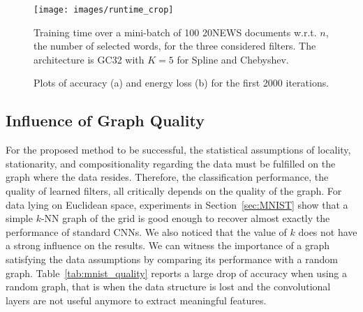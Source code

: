 \documentclass{article}
\newcommand{\tabref}[1]{Table~\ref{tab:#1}}
\newcommand{\secref}[1]{Section~\ref{sec:#1}}
\begin{document}
\begin{figure}[ht]
\centering
\vspace{-20pt}
\texttt{[image: images/runtime\_crop]}
\caption{Training time over a mini-batch of 100 20NEWS documents w.r.t. $n$, the
number of selected words, for the three considered filters. The architecture is
GC32 with $K=5$ for Spline and Chebyshev.}
\label{fig:runtime}
\end{figure}

\begin{figure}[h!]
\centering
{}
\hfill
{}
\caption{Plots of accuracy (a) and energy loss (b) for the first 2000
iterations.}
\label{fig:convergence}
\end{figure}











\subsection{Influence of Graph Quality} \label{sec:graph_quality}

For the proposed method to be successful, the statistical assumptions of  locality, stationarity, and compositionality regarding the data must be fulfilled on the graph where the data resides. Therefore, the classification performance, the quality of learned filters, all critically depends on the quality of the graph. For data lying on Euclidean space, experiments in    
 \secref{MNIST} show that a simple $k$-NN graph of the grid is good enough to recover almost exactly the performance of standard CNNs. We also noticed that the value of $k$ does not have a strong influence on the results. We can witness the importance of a graph satisfying the data assumptions by comparing its performance with a random
graph. \tabref{mnist_quality} reports a large drop of accuracy when using a random graph, that is when the data structure is lost and the convolutional layers are not useful anymore to extract meaningful features.
\end{document}
